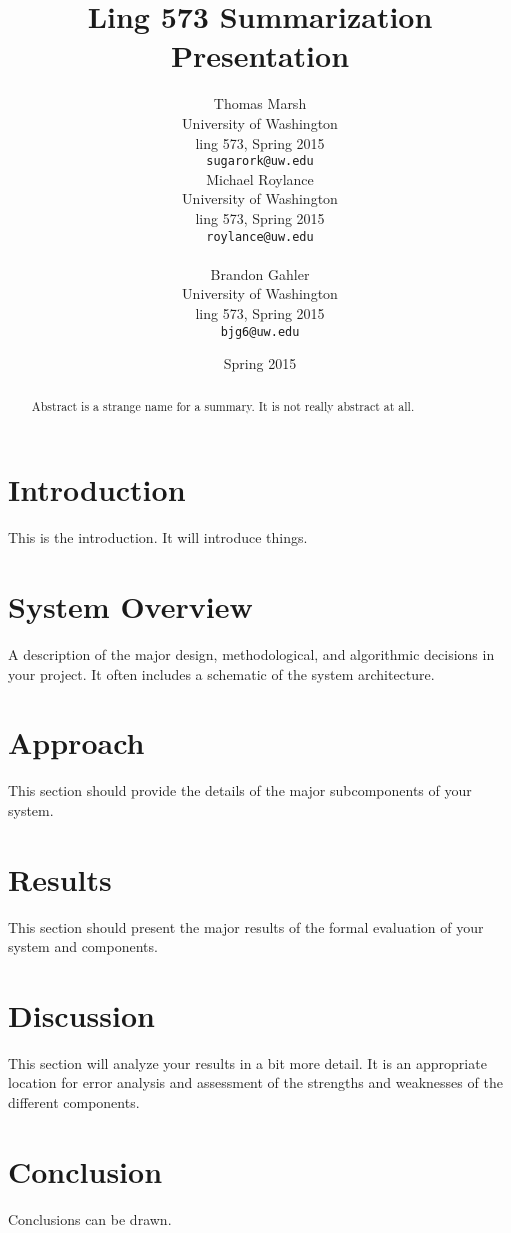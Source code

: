 \documentclass[11pt]{article}
\title{Ling 573 Summarization Presentation}
\author{Thomas Marsh \\
  University of Washington \\
  ling 573, Spring 2015 \\
  {\tt sugarork@uw.edu\hspace{5mm}} \\\And
  Michael Roylance \\
  University of Washington \\
  ling 573, Spring 2015 \\
  {\tt roylance@uw.edu} \\
\\\And
  Brandon Gahler  \\
  University of Washington \\
  ling 573, Spring 2015 \\
  {\tt bjg6@uw.edu} \\}
\date{Spring 2015}
\begin{document}
\maketitle
\begin{abstract}
  Abstract is a strange name for a summary.  It is not really abstract at all.
\end{abstract}


\section{Introduction}

This is the introduction.  It will introduce things. 

\section{System Overview}

A description of the major design, methodological, and algorithmic decisions in your project. It often includes a schematic of the system architecture.

\section{Approach}

This section should provide the details of the major subcomponents of your system.

\section{Results}

This section should present the major results of the formal evaluation of your system and components.

\section{Discussion}

This section will analyze your results in a bit more detail. It is an appropriate location for error analysis and assessment of the strengths and weaknesses of the different components.

\section{Conclusion}

Conclusions can be drawn.

%
%
\end{document}
